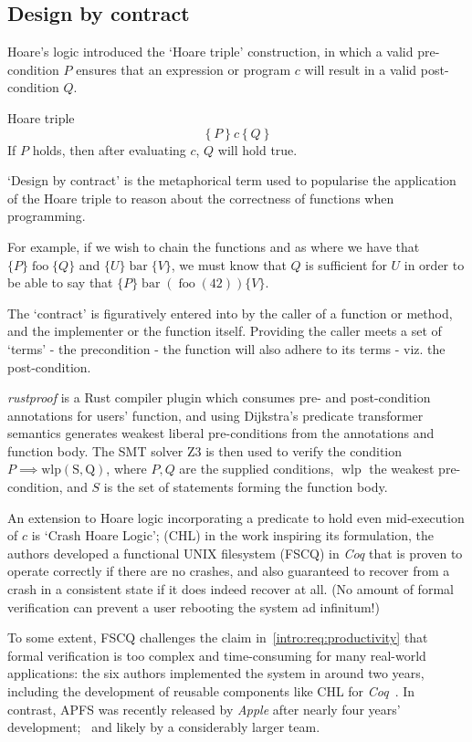 \subsection{Design by contract} \label{bg:dbc}

Hoare's logic introduced the `Hoare triple' construction, in which a valid pre-condition $P$ ensures that an expression or program $c$ will result in a valid post-condition $Q$. \cite{hoare_logic}

\begin{defn}Hoare triple \label{def:bg:dbc:hoare-triple}
\[
    \left\{P\right\} c \left\{Q\right\}
\] If $P$ holds, then after evaluating $c$, $Q$ will hold true.
\end{defn}

`Design by contract' is the metaphorical term used to popularise the application of the Hoare triple to reason about the correctness of functions when programming.

For example, if we wish to chain the functions  and  as  where we have that $\{P\}\operatorname{foo}\{Q\}$ and $\{U\}\operatorname{bar}\{V\}$, we must know that $Q$ is sufficient for $U$ in order to be able to say that $\{P\} \operatorname{bar}\left(\operatorname{foo}\left(42\right)\right) \{V\}$.

The `contract' is figuratively entered into by the caller of a function or method, and the implementer or the function itself. Providing the caller meets a set of `terms' - the precondition - the function will also adhere to its terms - viz. the post-condition.

\emph{rustproof} is a Rust compiler plugin  which consumes pre- and post-condition annotations for users' function, and using Dijkstra's predicate transformer semantics generates weakest liberal pre-conditions from the annotations and function body. The SMT solver Z3 is then used to verify the condition $P \implies \operatorname{wlp(S, Q)}$, where $P,Q$ are the supplied conditions, $\operatorname{wlp}$ the weakest pre-condition, and $S$ is the set of statements forming the function body. \cite{rust_rustproof}

An extension to Hoare logic incorporating a predicate to hold even mid-execution of $c$ is `Crash Hoare Logic'; (CHL) in the work inspiring its formulation, the authors developed a functional UNIX filesystem (FSCQ) in \emph{Coq} that is proven to operate correctly if there are no crashes, and also guaranteed to recover from a crash in a consistent state if it does indeed recover at all. \cite{fscq} (No amount of formal verification can prevent a user rebooting the system ad infinitum!)

To some extent, FSCQ challenges the claim in~\cref{intro:req:productivity} that formal verification is too complex and time-consuming for many real-world applications: the six authors implemented the system in around two years, including the development of reusable components like CHL for \emph{Coq}~\cite{fscq}. In contrast, APFS was recently released by \emph{Apple} after nearly four years' development;~\cite{apfs_detail} and likely by a considerably larger team.